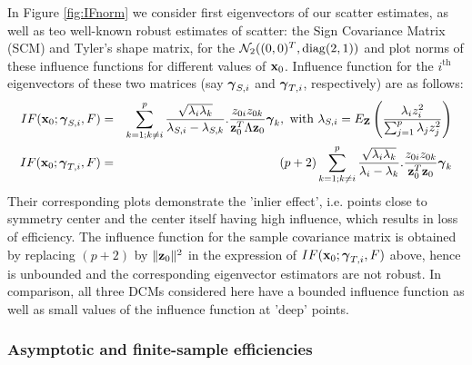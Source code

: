 In Figure \ref{fig:IFnorm} we consider first eigenvectors of our scatter estimates, as well as teo well-known robust estimates of scatter: the Sign Covariance Matrix (SCM) and Tyler's shape matrix, for the $\mathcal{N}_2((0,0)^T, \operatorname*{diag}(2,1))$ and plot norms of these influence functions for different values of ${\bf{x}}_0$. Influence function for the $i^\text{th}$ eigenvectors of these two matrices (say ${\boldsymbol{\gamma}}_{S,i}$ and ${\boldsymbol{\gamma}}_{T,i}$, respectively) are as follows:
%
\begin{eqnarray*}
\quad IF({\bf{x}}_0; {\boldsymbol{\gamma}}_{S,i}, F) &=& \sum_{k=1; k \neq i}^p \frac{\sqrt{\lambda_i \lambda_k}}{\lambda_{S,i} - \lambda_{S,k}}. \frac{z_{0i} z_{0k}}{{\bf{z}}_0^T \Lambda {\bf{z}}_0} {\boldsymbol{\gamma}}_k, \text{ with } \lambda_{S,i} = E_{\mathbf{Z}} \left( \frac{\lambda_i z_i^2}{\sum_{j=1}^p \lambda_j z_j^2} \right) \quad \\
IF({\bf{x}}_0; {\boldsymbol{\gamma}}_{T,i}, F) &=& (p+2) \sum_{k=1; k \neq i}^p \frac{\sqrt{\lambda_i \lambda_k}}{\lambda_i - \lambda_k}. \frac{z_{0i} z_{0k}}{{\bf{z}}_0^T {\bf{z}}_0} {\boldsymbol{\gamma}}_k \quad 
\end{eqnarray*}
%
Their corresponding plots demonstrate the 'inlier effect', i.e. points close to symmetry center and the center itself having high influence, which results in loss of efficiency. The influence function for the sample covariance matrix is obtained by replacing $(p+2)$ by $\| {\bf{z}}_0 \|^2$ in the expression of $IF({\bf{x}}_0; {\boldsymbol{\gamma}}_{T,i}, F)$ above, hence is unbounded and the corresponding eigenvector estimators are not robust. In comparison, all three DCMs considered here have a bounded influence function as well as small values of the influence function at 'deep' points.

\subsubsection{Asymptotic and finite-sample efficiencies}

